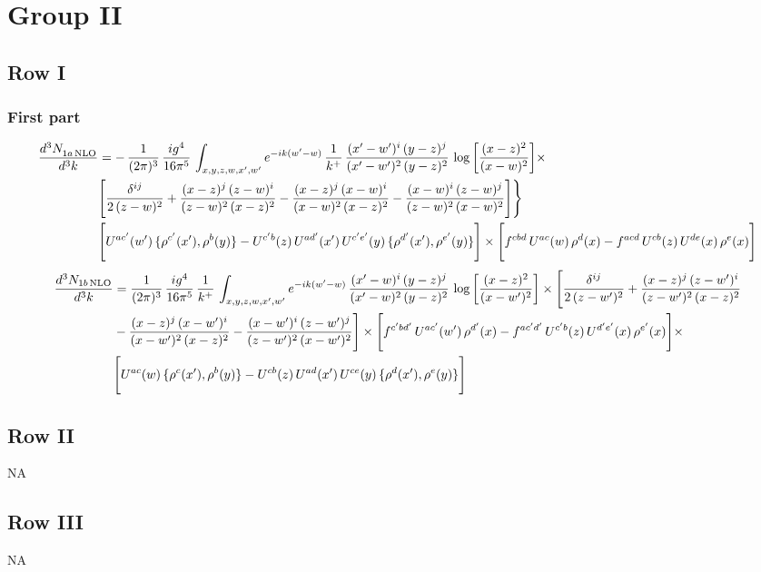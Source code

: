 \documentclass[9pt]{article}
\numberwithin{equation}{section}
\begin{document}
\section{Group II}
\subsection{Row I}
\subsubsection{First part}
\begin{align}
 \frac{d^{3}N_{1a\,\rm NLO}^{\rm}}{d^{3}k}  & = -\,\frac{1}{(2\pi)^{3}}\,\frac{ig^{4}}{16\pi^{5}}\,\int_{x,y,z,w,x',w^{\prime}} e^{-ik(w^{\prime}-w)}\,\frac{1}{k^{+}}\, \frac{(x'-w')^{i}\,(y-z)^{j}}{(x'-w')^{2}\,(y-z)^{2}}\,\log{\left[\frac{(x-z)^{2}}{(x-w)^{2}}\right]}\times\notag \\ &  \Bigg[\frac{\delta^{ij}}{2\,(z-w)^{2}}+\frac{(x-z)^{j}\,(z-w)^{i}}{(z-w)^{2}\,(x-z)^{2}}-\frac{(x-z)^{j}\,(x-w)^{i}}{(x-w)^{2}\,(x-z)^{2}}-\frac{(x-w)^{i}\,(z-w)^{j}}{(z-w)^{2}\,(x-w)^{2}}\Bigg]\Bigg\} \notag \\ & \Bigg[U^{ac'}(w')\,\{\rho^{c'}(x'),\rho^{b}(y)\}-U^{c'b}(z)\,U^{ad'}(x')\,U^{c'e'}(y)\, \{\rho^{d'}(x'),\rho^{e'}(y)\}\Bigg]\times \Bigg[f^{cbd}\,U^{ac}(w)\,\rho^{d}(x)-f^{acd}\, U^{cb}(z)\,U^{de}(x)\,\rho^{e}(x)\Bigg]
\end{align}
\begin{align}
\frac{d^{3}N_{1b\, \rm NLO}}{d^{3}k} & =  \frac{1}{(2\pi)^{3}}\,\frac{ig^{4}}{16\pi^{5}}\,\frac{1}{k^{+}}\,\int_{x,y,z,w,x',w^{\prime}} e^{-ik(w^{\prime}-w)}\,  \frac{(x'-w)^{i}\,(y-z)^{j}}{(x'-w)^{2}\,(y-z)^{2}}\,\log{\left[\frac{(x-z)^{2}}{(x-w')^{2}}\right]}\times \Bigg[\frac{\delta^{ij}}{2\,(z-w')^{2}}+\frac{(x-z)^{j}\,(z-w')^{i}}{(z-w')^{2}\,(x-z)^{2}}\notag \\ &  -\frac{(x-z)^{j}\,(x-w')^{i}}{(x-w')^{2}\,(x-z)^{2}} -\frac{(x-w')^{i}\,(z-w')^{j}}{(z-w')^{2}\,(x-w')^{2}}\Bigg] \times\Bigg[f^{c'bd'}\,U^{ac'}(w')\,\rho^{d'}(x)-f^{ac'd'}\, U^{c'b}(z)\,U^{d'e'}(x)\,\rho^{e'}(x)\Bigg] \times\notag \\ &  \Bigg[U^{ac}(w)\,\{\rho^{c}(x'),\rho^{b}(y)\}-U^{cb}(z)\,U^{ad}(x')\,U^{ce}(y)\, \{\rho^{d}(x'),\rho^{e}(y)\}\Bigg]
\end{align}
\subsection{Row II}
\textsc{NA}
\subsection{Row III}
\textsc{NA}
\end{document}
